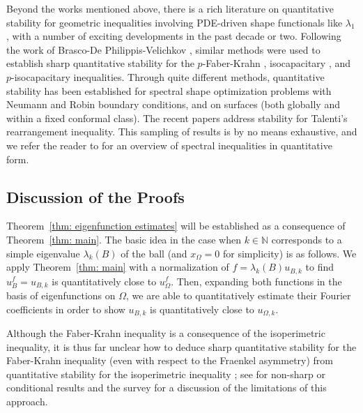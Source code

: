 \documentclass[10pt, reqno]{amsart}
\numberwithin{equation}{section}
\def\W{\Omega}
\begin{document}
Beyond the works mentioned above, there is a rich literature on quantitative stability for geometric inequalities involving PDE-driven shape functionals like $\lambda_1$, with a number of exciting developments in the past decade or two. 
Following the work of Brasco-De Philippis-Velichkov \cite{BDV15}, similar methods were used to establish sharp quantitative stability for the $p$-Faber-Krahn \cite{FuscoZhang}, isocapacitary  \cite{DPMMCapacity}, and $p$-isocapacitary \cite{Mukoseeva+2021} inequalities.
Through quite different methods, quantitative stability has been established for spectral shape optimization problems with Neumann \cite{BrascoPratelli} and Robin \cite{BucurRobinLaplacian} boundary conditions, and on surfaces \cite{MR4859580} (both globally and within a fixed conformal class). The recent papers \cite{acampora2025sharpquantitativetalentisinequality, amato2024talenticomparisonresultquantitative} address stability for Talenti's rearrangement inequality. This sampling of results is by no means exhaustive, and we refer the reader to \cite{BrascoDePSurvey} for an overview of spectral inequalities in quantitative form.




\subsection*{Discussion of the Proofs}
Theorem~\ref{thm: eigenfunction estimates} will be established as a consequence of Theorem~\ref{thm: main}. The basic idea in the case when $k\in \mathbb{N}$ corresponds to a simple eigenvalue $\lambda_k(B)$ of the ball (and $x_\W = 0$ for simplicity) is as follows. We apply Theorem~\ref{thm: main} with a normalization of $f = \lambda_k(B) u_{B,k}$ to find $u_B^f = u_{B, k}$ is quantitatively close to $u_\W^f$. Then, expanding both functions in the basis of eigenfunctions on $\W$, we are able to quantitatively estimate their Fourier coefficients in order to show $u_{B,k}$ is quantitatively close to $u_{\W ,k}$.

Although the Faber-Krahn inequality is a consequence of the isoperimetric inequality, it is thus far unclear how to deduce sharp quantitative stability for the Faber-Krahn inequality (even with respect to the Fraenkel asymmetry) from quantitative stability for the isoperimetric inequality \cite{FuMaPr, FiMaPr, CiLe12}; see \cite{Melas, HansenNadir94, FMP09} for non-sharp or conditional results and the survey \cite{BrascoDePSurvey} for a discussion of the limitations of this approach.
\end{document}
